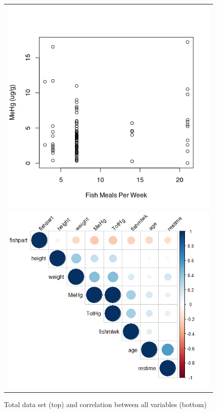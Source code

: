 \documentclass[twocolumn, 12pt]{report}
\begin{document}
\begin{figure}
	\begin{tabular}{c}
		\includegraphics[width=\linewidth]{res/all.png} \\
		\includegraphics[width=\linewidth]{res/correlation.png}
	\end{tabular}
	\caption{Total data set (top) and correlation between all variables (bottom)} 
	\label{fig:all}
\end{figure}
\end{document}
